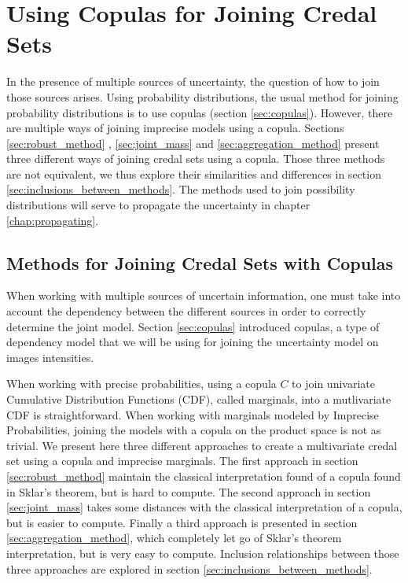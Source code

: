 \chapter{Using Copulas for Joining Credal Sets}\label{chap:joining_credal_sets}
In the presence of multiple sources of uncertainty, the question of how to join those sources arises. Using probability distributions, the usual method for joining probability distributions is to use copulas (section \ref{sec:copulas}). However, there are multiple ways of joining imprecise models using a copula. Sections \ref{sec:robust_method} , \ref{sec:joint_mass} and \ref{sec:aggregation_method} present three different ways of joining credal sets using a copula. Those three methods are not equivalent, we thus explore their similarities and differences in section \ref{sec:inclusions_between_methods}. The methods used to join possibility distributions will serve to propagate the uncertainty in chapter \ref{chap:propagating}.

\section{Methods for Joining Credal Sets with Copulas}\label{sec:methods_for_joining_credal_sets}
When working with multiple sources of uncertain information, one must take into account the dependency between the different sources in order to correctly determine the joint model. Section \ref{sec:copulas} introduced copulas, a type of dependency model that we will be using for joining the uncertainty model on images intensities. 

When working with precise probabilities, using a copula $C$ to join univariate Cumulative Distribution Functions (CDF), called marginals, into a mutlivariate CDF is straightforward. When working with marginals modeled by Imprecise Probabilities, joining the models with a copula on the product space is not as trivial. We present here three different approaches to create a multivariate credal set using a copula and imprecise marginals. The first approach in section \ref{sec:robust_method} maintain the classical interpretation found of a copula found in Sklar's theorem, but is hard to compute. The second approach in section \ref{sec:joint_mass} takes some distances with the classical interpretation of a copula, but is easier to compute. Finally a third approach is presented in section \ref{sec:aggregation_method}, which completely let go of Sklar's theorem interpretation, but is very easy to compute. Inclusion relationships between those three approaches are explored in section \ref{sec:inclusions_between_methods}.

